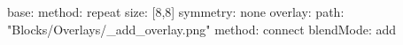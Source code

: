base:
  method: repeat
  size: [8,8]
  symmetry: none
overlay:
  path: "Blocks/Overlays/_add_overlay.png"
  method: connect
  blendMode: add
